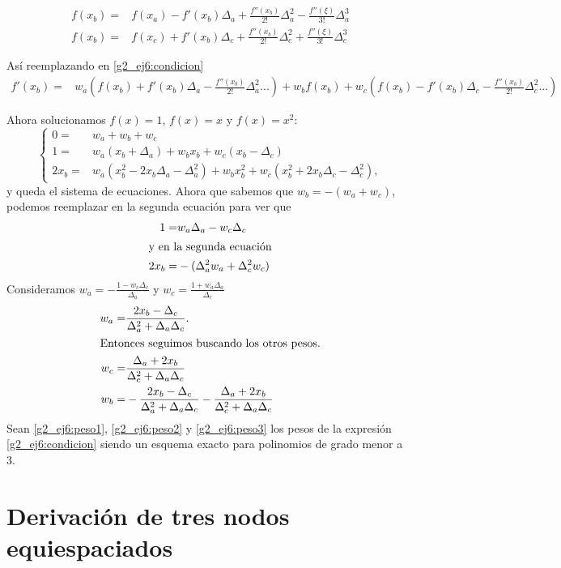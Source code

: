 \documentclass[../portafolio.tex]{subfiles}
\begin{document}
\begin{align}
f(x_b)=&f(x_a)-f'(x_b)\Delta_a+\frac{f''(x_b )}{2!}\Delta_a^2-\frac{f''(\xi)}{3!}\Delta_a^3\\
f(x_b)=&f(x_c)+f'(x_b)\Delta_c+\frac{f''(x_b )}{2!}\Delta_c^2+\frac{f''(\xi)}{3!}\Delta_c^3
\end{align}

Así reemplazando en \eqref{g2_ej6:condicion} 
\begin{align}
f'(x_b)=&  w_a\left(f(x_b)+f'(x_b)\Delta_a-\frac{f''(x_b )}{2!}\Delta_a^2...\right)+w_b f(x_b) + w_c\left(f(x_b)-f'(x_b)\Delta_c-\frac{f''(x_b )}{2!}\Delta_c^2...\right)\label{g2_ej6:swiftie}
\end{align}

Ahora solucionamos $f(x)=1$, $f(x)=x$ y $f(x)=x^2$:
\[
\begin{cases}
0=	& w_a+w_b  + w_c\\
1=	&w_a\left(x_b+\Delta_a\right)+w_b x_b + w_c\left(x_b-\Delta_c\right) \\
2x_b=&w_a\left(x_b^2-2x_b\Delta_a-\Delta_a^2\right)+w_b x_b^2 + w_c\left(x_b^2+2x_b\Delta_c-\Delta_c^2\right),
\end{cases}
\]
y queda el sistema de ecuaciones. Ahora que sabemos que $w_b=-(w_a +w_c)$, podemos reemplazar en la segunda ecuación para ver que
\begin{align}
1= &w_a\Delta_a   - w_c\Delta_c \\ \intertext{y en la segunda ecuación}
2x_b=&-(\Delta_a^2 w_a+ \Delta_c^2 w_c)
\end{align}
Consideramos $w_a=-\frac{1-w_c \Delta_c}{\Delta_a}$ y $w_c=\frac{1+w_a \Delta_a}{\Delta_c}$
\begin{align}
w_a=&\frac{ 2x_b-\Delta_c }{\Delta_a^2 +\Delta_a \Delta_c}.\label{g2_ej6:peso1}\\ \intertext{Entonces seguimos buscando los otros pesos.}
w_c=& \frac{\Delta_a + 2x_b}{\Delta_c^2 +\Delta_a \Delta_c}\label{g2_ej6:peso2}\\
w_b=& -\frac{ 2x_b-\Delta_c }{\Delta_a^2 +\Delta_a \Delta_c}-  \frac{\Delta_a + 2x_b}{\Delta_c^2 +\Delta_a \Delta_c}\label{g2_ej6:peso3}
\end{align}
Sean \eqref{g2_ej6:peso1}, \eqref{g2_ej6:peso2} y \eqref{g2_ej6:peso3} los pesos de la expresión \eqref{g2_ej6:condicion} siendo un esquema exacto para polinomios de grado menor a 3.
\section{Derivación de tres nodos equiespaciados}
\end{document}
